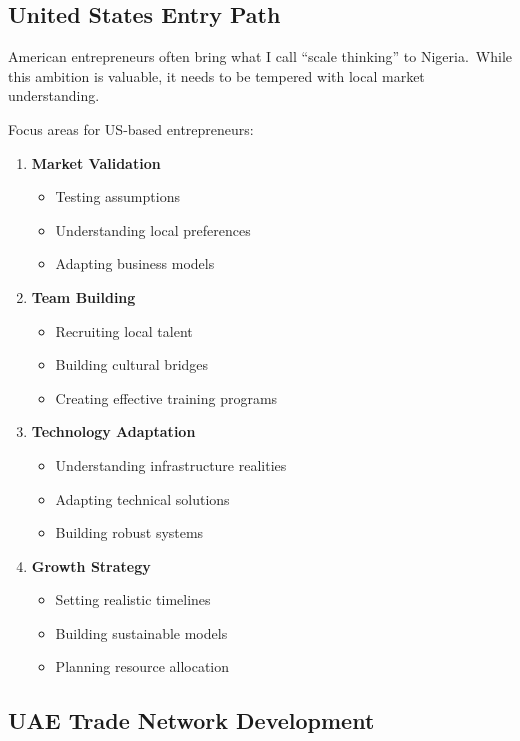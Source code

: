 \subsection{United States Entry Path}\label{subsec:us-entry-path}

American entrepreneurs often bring what I call ``scale thinking'' to Nigeria.\ While this ambition is valuable, it needs to be tempered with local market understanding.

Focus areas for US-based entrepreneurs:

\begin{enumerate}
    \item \textbf{Market Validation}
    \begin{itemize}
        \item Testing assumptions
        \item Understanding local preferences
        \item Adapting business models
    \end{itemize}

    \item \textbf{Team Building}
    \begin{itemize}
        \item Recruiting local talent
        \item Building cultural bridges
        \item Creating effective training programs
    \end{itemize}

    \item \textbf{Technology Adaptation}
    \begin{itemize}
        \item Understanding infrastructure realities
        \item Adapting technical solutions
        \item Building robust systems
    \end{itemize}

    \item \textbf{Growth Strategy}
    \begin{itemize}
        \item Setting realistic timelines
        \item Building sustainable models
        \item Planning resource allocation
    \end{itemize}
\end{enumerate}
\subsection{UAE Trade Network Development}\label{subsec:uae-trade-development}

